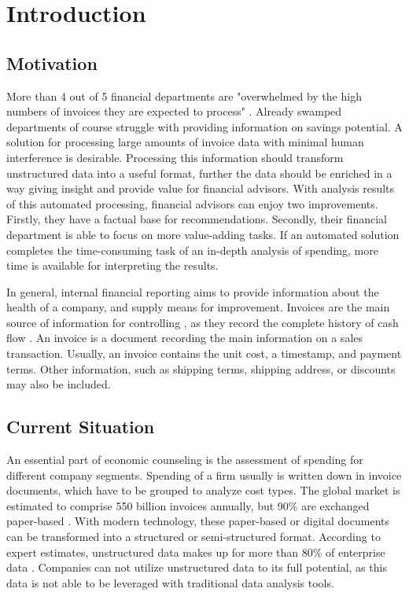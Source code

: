 \chapter{Introduction}
\section{Motivation}

More than 4 out of 5 financial departments are "overwhelmed by the high numbers of invoices they are expected to process"  \cite{manualInvoiceProcessing}. Already swamped departments of course struggle with providing information on savings potential. A solution for processing large amounts of invoice data with minimal human interference is desirable. Processing this information should transform unstructured data into a useful format, further the data should be enriched in a way giving insight and provide value for financial advisors. With analysis results of this automated processing, financial advisors can enjoy two improvements. Firstly, they have a factual base for recommendations. Secondly, their financial department is able to focus on more value-adding tasks. If an automated solution completes the time-consuming task of an in-depth analysis of spending, more time is available for interpreting the results.

In general, internal financial reporting aims to provide information about the health of a company, and supply means for improvement. Invoices are the main source of information for controlling \cite{investopediaInvoices}, as they record the complete history of cash flow \cite{invoicesPurpose}. An invoice is a document recording the main information on a sales transaction. Usually, an invoice contains the unit cost, a timestamp, and payment terms. Other information, such as shipping terms, shipping address, or discounts may also be included. 

\section{Current Situation}
An essential part of economic counseling is the assessment of spending for different company segments. Spending of a firm usually is written down in invoice documents, which have to be grouped  to analyze cost types.
The global market is estimated to comprise 550 billion invoices annually, but 90\% are exchanged paper-based \cite[p.~5]{kochEInvoicingJourney}. With modern technology, these paper-based or digital documents can be transformed into a structured or semi-structured format. According to expert estimates, unstructured data makes up for more than 80\% of enterprise data \cite{structuredAndUnstructuredData}. Companies can not utilize unstructured data to its full potential, as this data is not able to be leveraged with traditional data analysis tools.

